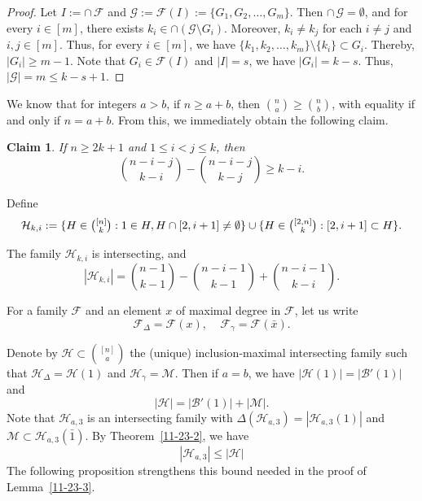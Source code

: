 \documentclass[11pt]{article}
\def\marrow{{\boldmath {\marginpar[\hfill$\rightarrow \rightarrow$]{$\leftarrow \leftarrow$}}}}
\def\andrey#1{{\sc Andrey: }{\marrow\sf \textcolor{blue}{#1}}}
\newcommand{\m}{\mathcal}
\def\yang#1{{\sc Yang: }{\marrow\sf \textcolor{cyan}{#1}}}
\newtheorem{claim}[theorem]{Claim}
\begin{document}
\begin{proof}
Let $I:=\cap \, \m F$ and $\m G:=\m F(I):=\{G_1, G_2, \dots, G_m\}$. 
Then $\cap \, \m G=\emptyset$, and for every $i\in [m]$, there exists $k_i\in \cap (\m G\setminus G_i)$. Moreover, $k_i\ne k_j$ for each $i\ne j$ and $i,j \in [m]$. 
Thus, for every $i\in [m]$, we have $\{k_1, k_2, \dots, k_m\}\setminus \{k_i\} \subset G_i$. Thereby, $|G_i|\ge m-1$. 
Note that $G_i \in \m F(I)$ and $|I|=s$, we have $|G_i|=k-s$.
Thus, $|\m G|=m\le k-s+1$.
\end{proof}

We know that for integers $a>b$, if $n\ge a+b$, then ${n\choose a}\ge {n\choose b}$, with equality if and only if $n=a+b$. From this, we immediately obtain the following claim.
\begin{claim}
    If $n\ge 2k+1$ and $1\le i<j\le k$, then 
    \begin{equation}\label{n>2k}
    {n-i-j\choose k-i}-{n-i-j\choose k-j}\ge k-i.
    \end{equation}
\end{claim}


Define 
\begin{equation}\label{hki}
\m H_{k,i}:=\{H\in \tbinom{[n]}{k}: 1\in H, H\cap [2,i+1]\ne \emptyset\}\cup \{H\in \tbinom{[2,n]}{k}: [2, i+1]\subset H\}.
\end{equation}

The family $\m H_{k,i}$ is intersecting, and 
\begin{equation}\label{sizeH}
    |\m H_{k,i}|={n-1\choose k-1}-{n-i-1\choose k-1}+{n-i-1\choose k-i}.
\end{equation}

For a family $\m F$ and an element $x$ of maximal degree in $\m F$, let us write $$\m F_\Delta = \m F(x),\ \ \ \ \ \m F_\gamma = \m F(\bar x).$$ 

Denote by $\mathcal{H}\subset {[n]\choose a}$ the (unique) inclusion-maximal intersecting family such that $\m H_{\Delta}=\m H(1)$ and $\mathcal{H}_{\gamma}=\mathcal{M}$.
Then if $a=b$, we have
$|\mathcal{H}(1)|=|\mathcal{B}'(1)|$ and 
\begin{equation}\label{12-6-1}
|\mathcal{H}|=|\mathcal{B}'(1)|+|\mathcal{M}|.
\end{equation} 
Note that $\m H_{a,3}$ is an intersecting family with $\Delta(\m H_{a,3})=|\m H_{a,3}(1)|$ and $\m M \subset \m H_{a,3}(\bar{1})$. 
By Theorem~\ref{11-23-2}, we have 
\begin{equation}\label{5-7-1} 
    |\mathcal{H}_{a,3}| \le |\mathcal{H}|
\end{equation}
The following proposition strengthens this bound needed in  the proof of Lemma~\ref{11-23-3}. 
\end{document}
